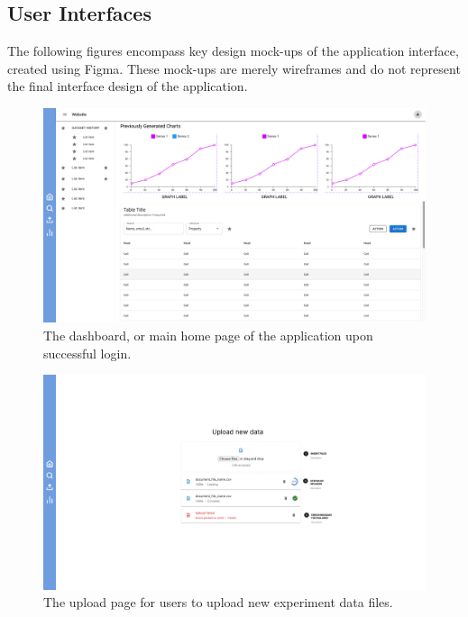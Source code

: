 \documentclass[12pt, titlepage]{article}
\begin{document}
\begin{description}
\begin{description}
\section{User Interfaces}
The following figures encompass key design mock-ups of the application
interface, created using Figma. These mock-ups are merely wireframes and do not
represent the final interface design of the application.
\begin{figure}[htbp]
  \centering
  \includegraphics[width=\textwidth]{Figma/dashboard.pdf}
  \caption{The dashboard, or main home page of the application upon successful login.}
  \label{fig:FigUIDB}
\end{figure}

\begin{figure}[htbp]
  \centering
  \includegraphics[width=\textwidth]{Figma/upload.pdf}
  \caption{The upload page for users to upload new experiment data files.}
  \label{fig:FigUIUP}
\end{figure}


\end{description}
\end{description}
\end{document}
